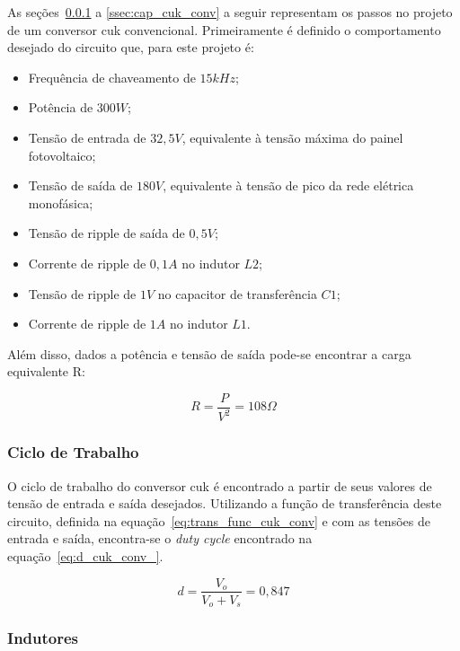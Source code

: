 \documentclass[
	12pt,				%
	openright,			%
	onseside,
	a4paper,			%
	english,			%
	french,				%
	spanish,			%
	brazil,				%
	]{abntex2}
\begin{document}
As seções~\ref{ssec:d_cuk_conv} a \ref{ssec:cap_cuk_conv} a seguir representam os passos no projeto de um conversor cuk convencional. Primeiramente é definido o comportamento desejado do circuito que, para este projeto é:

\begin{itemize}%
	\item Frequência de chaveamento de $15kHz$;
	\item Potência de $300W$;
	\item Tensão de entrada de $32,5V$, equivalente à tensão máxima do painel fotovoltaico;
	\item Tensão de saída de $180V$, equivalente à tensão de pico da rede elétrica monofásica;
	\item Tensão de ripple de saída de $0,5V$;
	\item Corrente de ripple de $0,1A$ no indutor $L2$;
	\item Tensão de ripple de $1V$ no capacitor de transferência $C1$;
	\item Corrente de ripple de $1A$ no indutor $L1$.
\end{itemize}

Além disso, dados a potência e tensão de saída pode-se encontrar a carga equivalente R:

\begin{equation}%
	R = \frac{P}{V^2} = 108 \Omega \label{eq:cuk_load}
\end{equation}

\subsubsection{Ciclo de Trabalho}\label{ssec:d_cuk_conv}

O ciclo de trabalho do conversor cuk é encontrado a partir de seus valores de tensão de entrada e saída desejados. Utilizando a função de transferência deste circuito, definida na equação~\ref{eq:trans_func_cuk_conv} e com as tensões de entrada e saída, encontra-se o \textit{duty cycle} encontrado na equação~\ref{eq:d_cuk_conv_}.

\begin{equation}%
	d = \frac{V_{o}}{V_{o}+V_{s}} = 0,847 \label{eq:d_cuk_conv_}
\end{equation}

\subsubsection{Indutores}
\end{document}
